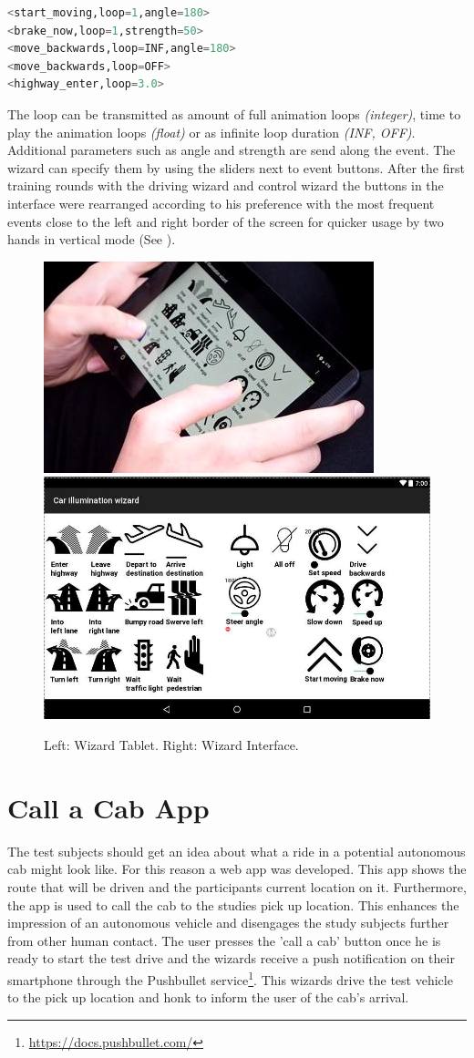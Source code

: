 \begin{lstlisting}[caption={Examples of event messages.},label={lst:eventmessage},language=Python]
<start_moving,loop=1,angle=180>
<brake_now,loop=1,strength=50>
<move_backwards,loop=INF,angle=180>
<move_backwards,loop=OFF>
<highway_enter,loop=3.0>
\end{lstlisting}

The loop can be transmitted as amount of full animation loops \emph{(integer)}, time to play the animation loops \emph{(float)} or as infinite loop duration \emph{(INF, OFF)}. Additional parameters such as angle and strength are send along the event. The wizard can specify them by using the sliders next to event buttons.   
After the first training rounds with the driving wizard and control wizard the buttons in the interface were rearranged according to his preference with the most frequent events close to the left and right border of the screen for quicker usage by two hands in vertical mode (See  \emph{}). 

\begin{figure}
    \includegraphics[height=0.31\textwidth]{fig/WizardHands}\hfill\includegraphics[height=0.31\textwidth]{fig/IlluminationWizard-.JPG}
    \caption[Wizard Tab]{Left: Wizard Tablet. 
   Right: Wizard Interface.}
    \label{fig:wizard}
\end{figure}

\section{Call a Cab App}
\label{sec:capp}
The test subjects should get an idea about what a ride in a potential autonomous cab might look like. For this reason a web app was developed. This app shows the route that will be driven and the participants current location on it. Furthermore, the app is used to call the cab to the studies pick up location. This enhances the impression of an autonomous vehicle and disengages the study subjects further from other human contact. The user presses the 'call a cab' button once he is ready to start the test drive and the wizards receive a push notification on their smartphone through the Pushbullet service\footnote{\url{https://docs.pushbullet.com/}}. This wizards drive the test vehicle to the pick up location and honk to inform the user of the cab's arrival. 

